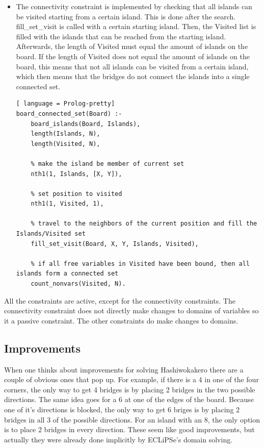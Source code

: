 \documentclass{report}
\begin{document}
\begin{itemize}
    \item The connectivity constraint is implemented by checking that all islands can be visited starting from a certain island. This is done after the search. fill\_set\_visit is called with a certain starting island. Then, the Visited list is filled with the islands that can be reached from the starting island. Afterwards, the length of Visited must equal the amount of islands on the board. If the length of Visited does not equal the amount of islands on the board, this means that not all islands can be visited from a certain island, which then means that the bridges do not connect the islands into a single connected set.
\begin{lstlisting}[ language = Prolog-pretty]
board_connected_set(Board) :-
    board_islands(Board, Islands),
    length(Islands, N),
    length(Visited, N),

    % make the island be member of current set
    nth1(1, Islands, [X, Y]),

    % set position to visited
    nth1(1, Visited, 1),

    % travel to the neighbors of the current position and fill the Islands/Visited set
    fill_set_visit(Board, X, Y, Islands, Visited),

    % if all free variables in Visited have been bound, then all islands form a connected set
    count_nonvars(Visited, N).
\end{lstlisting}
    
\end{itemize}
All the constraints are active, except for the connectivity constraints. The connectivity constraint does not directly make changes to domains of variables so it a passive constraint. The other constraints do make changes to domains. 
\subsection{Improvements}
When one thinks about improvements for solving Hashiwokakero there are a couple of obvious ones that pop up. For example, if there is a 4 in one of the four corners, the only way to get 4 bridges is by placing 2 bridges in the two possible directions. The same idea goes for a 6 at one of the edges of the board. Because one of it's directions is blocked, the only way to get 6 briges is by placing 2 bridges in all 3 of the possible directions. For an island with an 8, the only option is to place 2 bridges in every direction. These seem like good improvements, but actually they were already done implicitly by ECLiPSe's domain solving.
\newline
\end{document}

